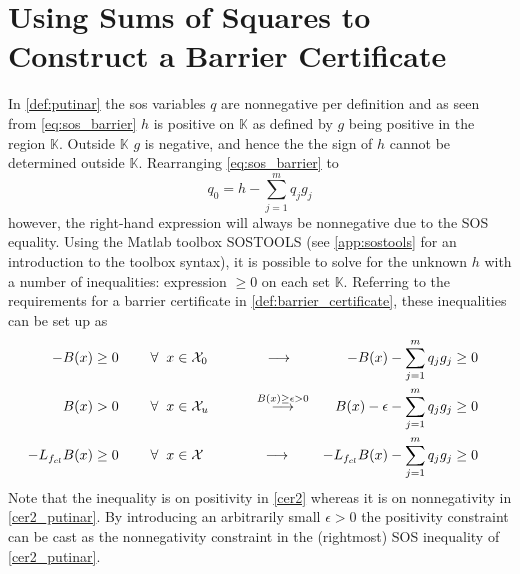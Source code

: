\section{Using Sums of Squares to Construct a Barrier Certificate}
In \autoref{def:putinar} the \gls{sos} variables $q$ are nonnegative per definition and as seen from \autoref{eq:sos_barrier} $h$ is positive on $\mathbb{K}$ as defined by $g$ being positive in the region $\mathbb{K}$. Outside $\mathbb{K}$ $g$ is negative, and hence the the sign of $h$ cannot be determined outside $\mathbb{K}$.
Rearranging \autoref{eq:sos_barrier} to
\begin{equation}
q_0 = h - \sum _{j=1}^{m}q_jg_j \label{eq:putinar_sos}
\end{equation} 
however, the right-hand expression will always be nonnegative due to the SOS equality. Using the Matlab toolbox SOSTOOLS (see \autoref{app:sostools} for an introduction to the toolbox syntax), it is possible to solve for the unknown $h$ with a number of inequalities: expression $\geq 0$ on each set $\mathbb{K}$. Referring to the requirements for a barrier certificate in \autoref{def:barrier_certificate}, these inequalities can be set up as
\begin{subequations}\label{eq:barrier_constraints_putinar}
\begin{flalign}
	-B(x) &\geq 0 \hspace{0.8cm}  \forall \hspace{2mm} x \in \mathcal{X}_0 \qquad\qquad \longrightarrow& 
	-B(x) - \sum _{j=1}^{m}q_jg_j &\geq 0 && \label{cer1_putinar}\\
	B(x) &> 0 \hspace{0.8cm}  \forall \hspace{2mm} x \in \mathcal{X}_u \qquad\quad\, \overset{B(x) \geq \epsilon > 0}{\longrightarrow}& 
	B(x)-\epsilon - \sum _{j=1}^{m}q_jg_j &\geq 0 &&\label{cer2_putinar} \\
	-L_{f_{cl}}B(x) &\geq 0 \hspace{0.8cm}  \forall \hspace{2mm} x \in \mathcal{X} \qquad\qquad\, \longrightarrow& 
	-L_{f_{cl}}B(x) - \sum _{j=1}^{m}q_jg_j &\geq 0 && \label{cer3_putinar}
\end{flalign}
\end{subequations}
Note that the inequality is on positivity in \autoref{cer2} whereas it is on nonnegativity in \autoref{cer2_putinar}. By introducing an arbitrarily small $\epsilon>0$ the positivity constraint can be cast as the nonnegativity constraint in the (rightmost) SOS inequality of \autoref{cer2_putinar}. %

